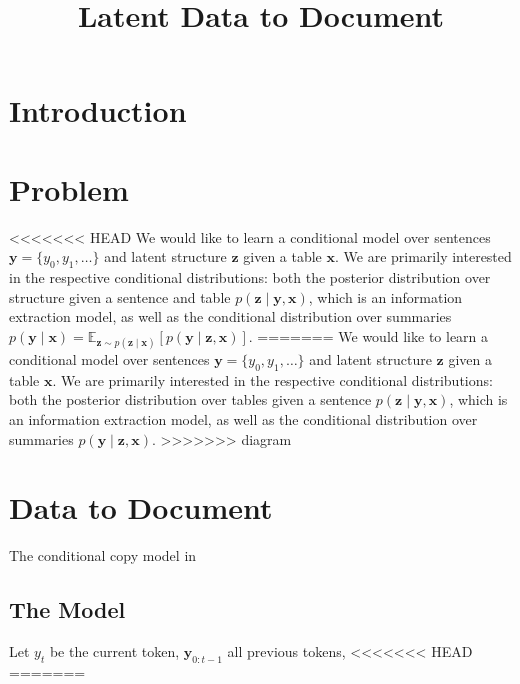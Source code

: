 \documentclass{article}
\title{Latent Data to Document}
\newcommand\Es[2]{\mathbb{E}_{#1}\left[#2\right]}
\newcommand{\bx}{\mathbf{x}}
\newcommand{\by}{\mathbf{y}}
\newcommand{\bz}{\mathbf{z}}
\begin{document}
\maketitle

\section{Introduction}

\section{Problem}
<<<<<<< HEAD
We would like to learn a conditional model
over sentences $\by = \{y_0, y_1, \ldots\}$ and latent structure $\bz$
given a table $\bx$.
We are primarily interested in the respective conditional distributions:
both the posterior distribution over structure given a sentence and table $p(\bz\mid\by,\bx)$,
which is an information extraction model,
as well as the conditional distribution over summaries
$p(\by\mid\bx)=\Es{\bz\sim p(\bz\mid\bx)}{p(\by\mid\bz,\bx)}$.
=======
We would like to learn a conditional model over sentences $\by = \{y_0, y_1, \ldots\}$
and latent structure $\bz$ given a table $\bx$.  
We are primarily interested in the respective conditional distributions:
both the posterior distribution over tables given a sentence $p(\bz\mid\by,\bx)$,
which is an information extraction model,
as well as the conditional distribution over summaries $p(\by\mid\bz,\bx)$.
>>>>>>> diagram

\section{Data to Document}
The conditional copy model in \citet{wiseman2017d2t}

\subsection{The Model}
Let $y_t$ be the current token, $\by_{0:t-1}$ all previous tokens,
<<<<<<< HEAD
=======
\end{document}
